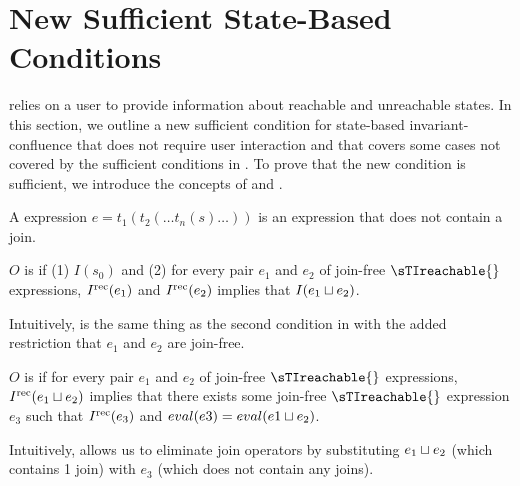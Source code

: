 \section{New Sufficient State-Based Conditions}
 relies on a user to provide information
about reachable and unreachable states. In this section, we outline a new
sufficient condition for state-based invariant-confluence that does not require
user interaction and that covers some cases not covered by the sufficient
conditions in . To prove that the new condition is
sufficient, we introduce the concepts of \dsTIconfluence{} and
\dsTIreduction{}.

\begin{definition}
  A  expression $e = t_1(t_2(\ldots t_n(s) \ldots))$ is an
  expression that does not contain a join.
\end{definition}

\begin{definition}
  $O$ is  if (1) $I(s_0)$ and (2) for every pair
  $e_1$ and $e_2$ of join-free $\sTIreachable{}$ expressions, $I^{\text{rec}}(e_1)$ and
  $I^{\text{rec}}(e_2)$ implies that $I(e_1 \sqcup e_2)$.
\end{definition}

Intuitively, \dsTIconfluence{} is the same thing as the second condition in
 with the added restriction that
$e_1$ and $e_2$ are join-free.

\begin{definition}
  $O$ is  if for every pair $e_1$ and $e_2$ of
  join-free $\sTIreachable{}$ expressions, $I^{\text{rec}}(e_1 \sqcup e_2)$ implies that
  there exists some join-free $\sTIreachable{}$ expression $e_3$ such that
  $I^{\text{rec}}(e_3)$ and $eval(e3) = eval(e1 \sqcup e_2)$.
\end{definition}

Intuitively, \dsTIreduction{} allows us to eliminate join operators by
substituting $e_1 \sqcup e_2$ (which contains 1 join) with $e_3$ (which does not
contain any joins).

